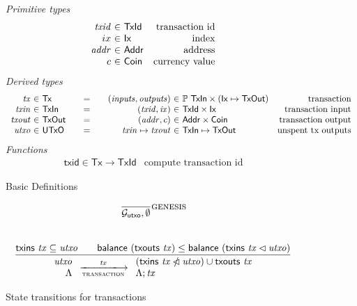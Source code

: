 \documentclass[11pt,a4paper]{article}
\newcommand{\powerset}[1]{\mathbb{P}~#1}
\newcommand{\restrictdom}{\lhd}
\newcommand{\subtractdom}{\mathbin{\slashed{\restrictdom}}}
\newcommand{\union}{\cup}
\newcommand{\var}[1]{\mathit{#1}}
\newcommand{\fun}[1]{\mathsf{#1}}
\newcommand{\type}[1]{\mathsf{#1}}
\newcommand{\transitionarrow}[2]{\xlongrightarrow[\textsc{#1}]{#2}}
\begin{document}
\begin{figure}[h]

\emph{Primitive types}
%
\begin{equation*}
\begin{array}{r@{~\in~}lr}
  \var{txid}
& \type{TxId}
& \text{transaction id}
\\
  ix
& \type{Ix}
& \text{index}
\\
  \var{addr}
& \type{Addr}
& \text{address}
\\
  c
& \type{Coin}
& \text{currency value}
\end{array}
\end{equation*}
%
\emph{Derived types}
%
\begin{equation*}
\begin{array}{r@{~\in~}l@{\qquad=\qquad}r@{~\in~}lr}
  \var{tx}
& \type{Tx}
& (\var{inputs}, \var{outputs})
& \powerset{\type{TxIn}} \times (\type{Ix} \mapsto \type{TxOut})
& \text{transaction}
\\
  \var{txin}
& \type{TxIn}
& (\var{txid}, \var{ix})
& \type{TxId} \times \type{Ix}
& \text{transaction input}
\\
  \var{txout}
& \type{TxOut}
& (\var{addr}, c)
& \type{Addr} \times \type{Coin}
& \text{transaction output}
\\
  \var{utxo}
& \type{UTxO}
& \var{txin} \mapsto \var{txout}
& \type{TxIn} \mapsto \type{TxOut}
& \text{unspent tx outputs}
\end{array}
\end{equation*}
%
\emph{Functions}
%
\begin{equation*}
\begin{array}{lr}
  \fun{txid} \in \type{Tx} \to \type{TxId}
& \text{compute transaction id}
\end{array}
\end{equation*}

\caption{Basic Definitions}
\label{fig:basic_definitions}
\end{figure}


\begin{figure}


\begin{equation*}
\frac{
}{
\mathcal{G}_{\fun{utxo}}, \emptyset
}
\textsc{genesis}
\end{equation*}
%
\\[1em]
%
\begin{equation*}
\frac{
  \fun{txins} ~ \var{tx} \subseteq \var{utxo} \qquad
  \fun{balance}~(\fun{txouts}~\var{tx}) \leq \fun{balance}~(\fun{txins} ~ \var{tx} \restrictdom \var{utxo})
}{
  \begin{array}{r}
    \var{utxo} \\
    \Lambda
  \end{array}
  \transitionarrow{transaction}{\var{tx}}
  \begin{array}{l}
  (\fun{txins} ~ \var{tx} \subtractdom \var{utxo}) \union \fun{txouts}~\var{tx} \\
  \Lambda ; \var{tx}
  \end{array}
}
\end{equation*}

\caption{State transitions for transactions}
\label{fig:transaction_transitions}
\end{figure}
\end{document}
